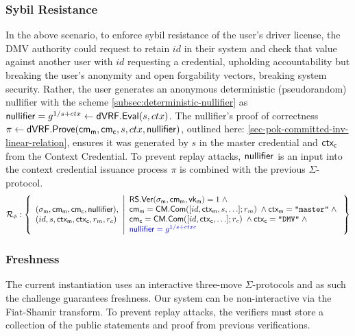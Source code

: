 \subsubsection*{Sybil Resistance}
In the above scenario, to enforce sybil resistance of the user's driver license, the DMV authority could request to retain $id$ in their system and check that value against another user with $id$ requesting a credential, upholding accountability but breaking the user's anonymity and open forgability vectors, breaking system security. Rather, the user generates an anonymous deterministic (pseudorandom) nullifier with the scheme \ref{subsec:deterministic-nullifier} as $\mathsf{nullifier} = g^{1/s + ctx} \gets \mathsf{dVRF.Eval}(s, ctx)$. The nullifier's proof of correctness $\pi \gets \mathsf{dVRF.Prove}(\mathsf{cm_m}, \mathsf{cm_c}, s, ctx, \mathsf{nullifier})$, outlined here: \ref{sec-pok-committed-inv-linear-relation}, ensures it was generated by $s$ in the master credential and $\mathsf{ctx_c}$ from the Context Credential. To prevent replay attacks, $\mathsf{nullifier}$ is an input into the context credential issuance process $\pi$ is combined with the previous $\Sigma$-protocol. 
\[
\mathcal{R}_{\phi}: \left\{ 
\begin{array}{l}
(\sigma_{\mathsf{m}}, \mathsf{cm_m}, \mathsf{cm_c}, \mathsf{nullifier}), \\
(id, s, \mathsf{ctx_m}, \mathsf{ctx_c}, r_m, r_c) 
\end{array}
\middle| 
\begin{array}{lcl}
    \mathsf{RS.Ver}(\sigma_{\mathsf{m}}, \mathsf{cm_m}, \mathsf{vk_m}) = 1 \; \wedge \; \\
    \mathsf{cm_m} = \mathsf{CM.Com}([id, \mathsf{ctx_m}, s, \ldots]; r_m) \; \wedge \mathsf{ctx_m} = \texttt{"master"} \; \wedge \; \\
    \mathsf{cm_c} = \mathsf{CM.Com}([id, \mathsf{ctx_c}, \ldots]; r_c) \; \wedge \mathsf{ctx_c} = \texttt{"DMV"} \; \wedge \; \\
    \textcolor{blue}{\mathsf{nullifier} = g^{1/s + ctxc}}
\end{array} \right\}
\]



\subsubsection*{Freshness}
The current instantiation uses an interactive three-move $\Sigma$-protocols and as such the challenge guarantees freshness. Our system can be non-interactive via the Fiat-Shamir transform. To prevent replay attacks, the verifiers must store a collection of the public statements and proof from previous verifications. 



